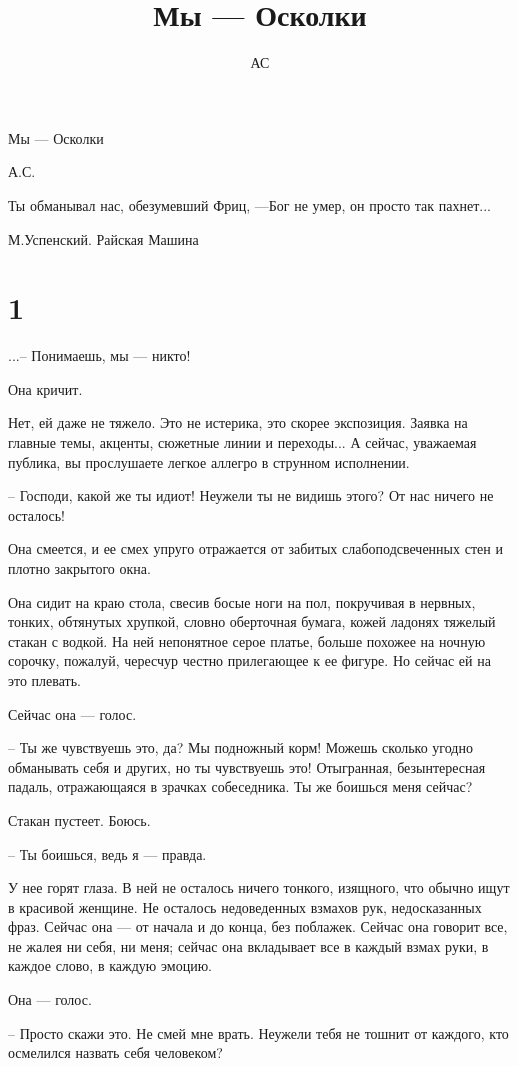 \documentclass[a5paper]{article}
\author{АС}
\title{Мы --- Осколки}
\begin{document}




Мы --- Осколки

А.С.

Ты обманывал нас, обезумевший Фриц, ---Бог не умер, он просто так пахнет...

М.Успенский. Райская Машина

\section{1}

...-- Понимаешь, мы --- никто!

Она кричит.

Нет, ей даже не тяжело. Это не истерика, это скорее экспозиция. Заявка на главные темы, акценты, сюжетные линии и переходы... А сейчас, уважаемая публика, вы прослушаете легкое аллегро в струнном исполнении.

-- Господи, какой же ты идиот! Неужели ты не видишь этого? От нас ничего не осталось!

Она смеется, и ее смех упруго отражается от забитых слабоподсвеченных стен и плотно закрытого окна.

Она сидит на краю стола, свесив босые ноги на пол, покручивая в нервных, тонких, обтянутых хрупкой, словно оберточная бумага, кожей ладонях тяжелый стакан с водкой. На ней непонятное серое платье, больше похожее на ночную сорочку, пожалуй, чересчур честно прилегающее к ее фигуре. Но сейчас ей на это плевать.

Сейчас она --- голос.

-- Ты же чувствуешь это, да? Мы подножный корм! Можешь сколько угодно обманывать себя и других, но ты чувствуешь это! Отыгранная, безынтересная падаль, отражающаяся в зрачках собеседника. Ты же боишься меня сейчас?

Стакан пустеет. Боюсь.

-- Ты боишься, ведь я --- правда.

У нее горят глаза. В ней не осталось ничего тонкого, изящного, что обычно ищут в красивой женщине. Не осталось недоведенных взмахов рук, недосказанных фраз. Сейчас она --- от начала и до конца, без поблажек. Сейчас она говорит все, не жалея ни себя, ни меня; сейчас она вкладывает все в каждый взмах руки, в каждое слово, в каждую эмоцию.

Она --- голос.

-- Просто скажи это. Не смей мне врать. Неужели тебя не тошнит от каждого, кто осмелился назвать себя человеком?
\end{document}
